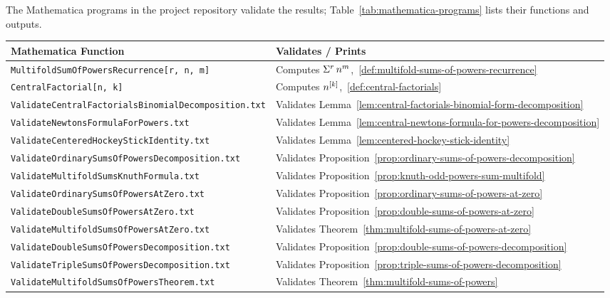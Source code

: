 The Mathematica programs in the project repository validate the results; Table~\ref{tab:mathematica-programs} lists their functions and outputs.
\begin{table}[H]
  \centering
  \small
  \renewcommand{\arraystretch}{1.3}
  \begin{tabular}{ll}
    \toprule
    \textbf{Mathematica Function} & \textbf{Validates / Prints}  \\
    \midrule
    \texttt{MultifoldSumOfPowersRecurrence[r, n, m]}
    & Computes $\Sigma^{r}\,{n}^{m}$,~\eqref{def:multifold-sums-of-powers-recurrence} \\
    \texttt{CentralFactorial[n, k]}
    & Computes $n^{[k]}$,~\eqref{def:central-factorials} \\
    \texttt{ValidateCentralFactorialsBinomialDecomposition.txt}
    & Validates Lemma~\eqref{lem:central-factorials-binomial-form-decomposition} \\
    \texttt{ValidateNewtonsFormulaForPowers.txt}
    & Validates Lemma~\eqref{lem:central-newtons-formula-for-powers-decomposition} \\
    \texttt{ValidateCenteredHockeyStickIdentity.txt}
    & Validates Lemma~\eqref{lem:centered-hockey-stick-identity} \\
    \texttt{ValidateOrdinarySumsOfPowersDecomposition.txt}
    & Validates Proposition~\eqref{prop:ordinary-sums-of-powers-decomposition} \\
    \texttt{ValidateMultifoldSumsKnuthFormula.txt}
    & Validates Proposition~\eqref{prop:knuth-odd-powers-sum-multifold} \\
    \texttt{ValidateOrdinarySumsOfPowersAtZero.txt}
    & Validates Proposition~\eqref{prop:ordinary-sums-of-powers-at-zero} \\
    \texttt{ValidateDoubleSumsOfPowersAtZero.txt}
    & Validates Proposition~\eqref{prop:double-sums-of-powers-at-zero} \\
    \texttt{ValidateMultifoldSumsOfPowersAtZero.txt}
    & Validates Theorem~\eqref{thm:multifold-sums-of-powers-at-zero} \\
    \texttt{ValidateDoubleSumsOfPowersDecomposition.txt}
    & Validates Proposition~\eqref{prop:double-sums-of-powers-decomposition} \\
    \texttt{ValidateTripleSumsOfPowersDecomposition.txt}
    & Validates Proposition~\eqref{prop:triple-sums-of-powers-decomposition} \\
    \texttt{ValidateMultifoldSumsOfPowersTheorem.txt}
    & Validates Theorem~\eqref{thm:multifold-sums-of-powers} \\

\end{tabular}
\end{table}
